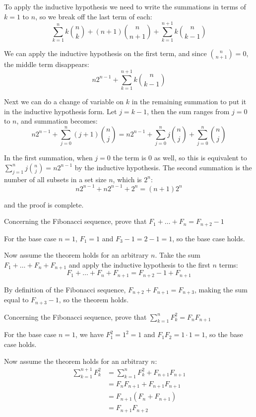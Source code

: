 \documentclass{article}
\begin{document}
To apply the inductive hypothesis we need to write the summations in terms of $k = 1$ to $n$, so we break off the last term of each:
$$\sum_{k=1}^n k \binom{n}{k} + (n+1)\binom{n}{n+1} + \sum_{k=1}^{n+1} k \binom{n}{k-1}$$

We can apply the inductive hypothesis on the first term, and since $\binom{n}{n+1} = 0$, the middle term disappears:
$$n2^{n-1} +\sum_{k=1}^{n+1} k \binom{n}{k-1}$$

Next we can do a change of variable on $k$ in the remaining summation to put it in the inductive hypothesis form. Let $j = k - 1$, then the sum ranges from $j = 0$ to $n$, and summation becomes:
$$n2^{n-1} + \sum_{j=0}^n (j + 1)\binom{n}{j} = n2^{n-1} + \sum_{j=0}^n j\binom{n}{j} + \sum_{j=0}^n \binom{n}{j}$$

In the first summation, when $j = 0$ the term is 0 as well, so this is equivalent to $\sum_{j=1}^n j \binom{n}{j} = n2^{n-1}$ by the inductive hypothesis. The second summation is the number of all subsets in a set size $n$, which is $2^n$:
$$n2^{n-1} + n2^{n-1} + 2^n = (n+1)2^n$$

and the proof is complete.

\begin{problem}
Concerning the Fibonacci sequence, prove that $F_1 + \ldots + F_n = F_{n+2} - 1$
\end{problem}

For the base case $n = 1$, $F_1 = 1$ and $F_3 - 1 = 2 - 1 = 1$, so the base case holds.

Now assume the theorem holds for an arbitrary $n$. Take the sum $F_1 + \ldots + F_n + F_{n+1}$ and apply the inductive hypothesis to the first $n$ terms:
$$F_1 + \ldots + F_n + F_{n+1} = F_{n+2} - 1 + F_{n+1}$$

By definition of the Fibonacci sequence, $F_{n+2} + F_{n+1} = F_{n+3}$, making the sum equal to $F_{n+3} - 1$, so the theorem holds.

\begin{problem}
Concerning the Fibonacci sequence, prove that $\sum_{k=1}^n F^2_k = F_n F_{n+1}$
\end{problem}

For the base case $n = 1$, we have $F_1^2 = 1^2 = 1$ and $F_1 F_2 = 1\cdot1 = 1$, so the base case holds.

Now assume the theorem holds for an arbitrary $n$:
\begin{align*}
    \sum_{k=1}^{n+1} F_k^2 & = \sum_{k=1}^n F_k^2 + F_{n+1}F_{n+1} \\
                           & = F_n F_{n+1} + F_{n+1}F_{n+1}        \\
                           & = F_{n+1}(F_n + F_{n+1})              \\
                           & = F_{n+1}F_{n+2}
\end{align*}
\end{document}
